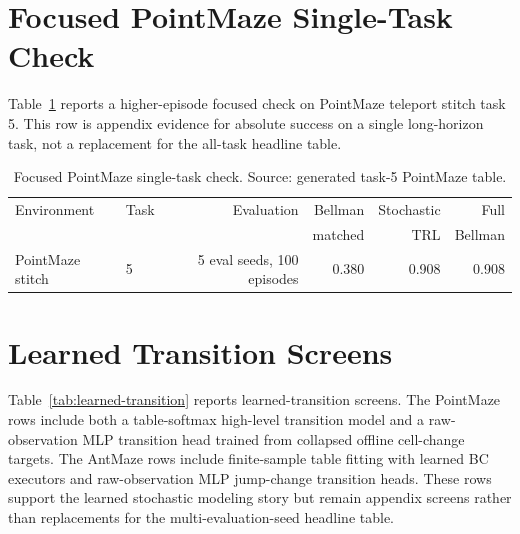 \documentclass[10pt]{article}
\begin{document}
\section{Focused PointMaze Single-Task Check}

Table~\ref{tab:pointmaze-single} reports a higher-episode focused check on
PointMaze teleport stitch task 5. This row is appendix evidence for absolute
success on a single long-horizon task, not a replacement for the all-task
headline table.

\begin{table}[t]
\centering
\caption{Focused PointMaze single-task check. Source: generated task-5
PointMaze table.}
\label{tab:pointmaze-single}
\begin{tabular}{llrrrr}
\toprule
Environment & Task & Evaluation & Bellman & Stochastic & Full\\
 & & & matched & TRL & Bellman\\
\midrule
PointMaze stitch & 5 & 5 eval seeds, 100 episodes & 0.380 & 0.908 & 0.908\\
\bottomrule
\end{tabular}
\end{table}

\section{Learned Transition Screens}

Table~\ref{tab:learned-transition} reports learned-transition screens. The
PointMaze rows include both a table-softmax high-level transition model and a
raw-observation MLP transition head trained from collapsed offline cell-change
targets. The AntMaze rows include finite-sample table fitting with learned BC
executors and raw-observation MLP jump-change transition heads. These rows
support the learned stochastic modeling story but remain appendix screens
rather than replacements for the multi-evaluation-seed headline table.
\end{document}
